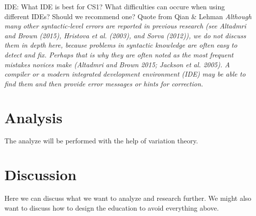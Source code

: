 \documentclass[twocolumn]{article}
\begin{document}
IDE: What IDE is best for CS1? What difficulties can occure when using different IDEs? Should we recommend one? Quote from Qian \& Lehman \emph{Although many other syntactic-level errors are reported in previous research (see Altadmri and Brown (2015), Hristova et al. (2003), and Sorva (2012)), we do not discuss them in depth here, because problems in syntactic knowledge are often easy to detect and fix. Perhaps that is why they are often noted as the most frequent mistakes novices make (Altadmri and Brown 2015; Jackson et al. 2005). A compiler or a modern integrated development environment (IDE) may be able to find them and then provide error messages or hints for correction.}


\section{Analysis}

The analyze will be performed with the help of variation theory. 

\section{Discussion}

Here we can discuss what we want to analyze and research further. We might also want to discuss how to design the education to avoid everything above.

\newpage
\end{document}
